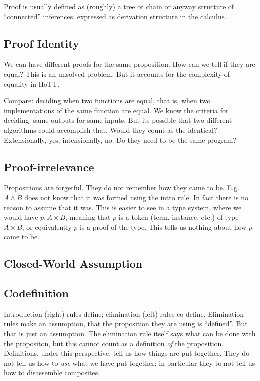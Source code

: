 \documentclass{article}
\begin{document}
Proof is usually defined as (roughly) a tree or chain or anyway
structure of ``connected'' inferences, expressed as derivation
structure in the calculus.

\subsection{Proof Identity}

We can have different proofs for the same proposition. How can we tell
if they are equal? This is an unsolved problem. But it accounts for
the complexity of equality in HoTT.

Compare: deciding when two functions are equal, that is, when two
implementations of the same function are equal. We know the criteria
for deciding: same outputs for same inputs. But its possible that two
different algorithms could accomplish that. Would they count as the
identical? Extensionally, yes; intensionally, no. Do they need to be
the same program?

\subsection{Proof-irrelevance}
Propositions are forgetful. They do not remember how they came to be.
E.g. \(A\land B\) does not know that it was formed using the intro
rule. In fact there is no reason to assume that it was. This is easier
to see in a type system, where we would have \(p:A\times B\), meaning
that \(p\) is a token (term, instance, etc.) of type \(A\times B\), or
equivalently \(p\) is a proof of the type. This tells us nothing about
how \(p\) came to be.

\subsection{Closed-World Assumption}



\subsection{Codefinition}

Introduction (right) rules define; elimination (left) rules co-define.
Elimination rules make an assumption, that the proposition they are
using is ``defined''. But that is just an assumption. The elimination
rule itself says what can be done with the propositon, but this cannot
count as a definition \textit{of} the proposition. Definitions, under
this perspective, tell us how things are put together. They do not
tell us how to \textit{use} what we have put together; in particular
they to not tell us how to disassemble composites.
\end{document}
